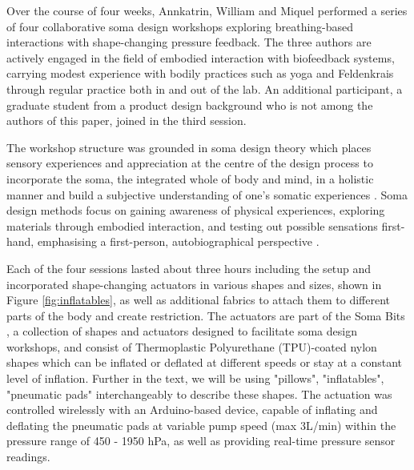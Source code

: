 Over the course of four weeks, Annkatrin, William and Miquel performed a series of four collaborative soma design workshops exploring breathing-based interactions with shape-changing pressure feedback. The three authors are actively engaged in the field of embodied interaction with biofeedback systems, carrying modest experience with bodily practices such as yoga and Feldenkrais through regular practice both in and out of the lab. An additional participant, a graduate student from a product design background who is not among the authors of this paper, joined in the third session. 

The workshop structure was grounded in soma design theory which places sensory experiences and appreciation at the centre of the design process to incorporate the soma, the integrated whole of body and mind, in a holistic manner and build a subjective understanding of one’s somatic experiences \cite{designing_2018}. Soma design methods focus on gaining awareness of physical experiences, exploring materials through embodied interaction, and testing out possible sensations first-hand, emphasising a first-person, autobiographical perspective \cite{hook_embracing_2018, neustaedter_autobiographical_2012}.


Each of the four sessions lasted about three hours including the setup and incorporated shape-changing actuators in various shapes and sizes, shown in Figure \ref{fig:inflatables}, as well as additional fabrics to attach them to different parts of the body and create restriction. The actuators are part of the Soma Bits \cite{somabits_2019}, a collection of shapes and actuators designed to facilitate soma design workshops, and consist of Thermoplastic Polyurethane (TPU)-coated nylon shapes which can be inflated or deflated at different speeds or stay at a constant level of inflation. Further in the text, we will be using "pillows", "inflatables", "pneumatic pads" interchangeably to describe these shapes. The actuation was controlled wirelessly with an Arduino-based device, capable of inflating and deflating the pneumatic pads at variable pump speed (max 3L/min) within the pressure range of 450 - 1950 hPa, as well as providing real-time pressure sensor readings.

